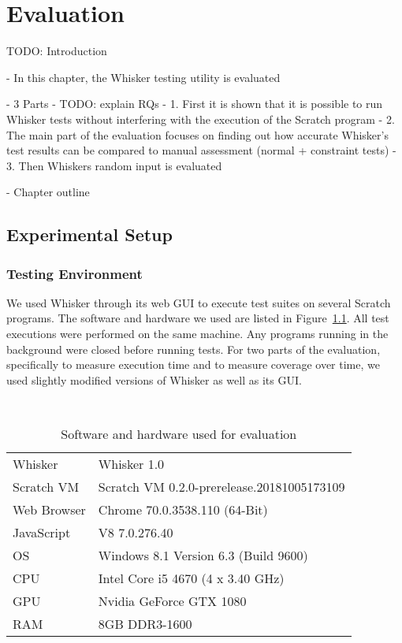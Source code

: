 

\chapter{Evaluation}%
\label{cha:evaluation}

TODO: Introduction

- In this chapter, the Whisker testing utility is evaluated

- 3 Parts
- TODO: explain RQs
    - 1. First it is shown that it is possible to run Whisker tests without interfering with the execution of the Scratch program
    - 2. The main part of the evaluation focuses on finding out how accurate Whisker's test results can be compared to manual assessment (normal + constraint tests)
    - 3. Then Whiskers random input is evaluated

- Chapter outline

\section{Experimental Setup}

\subsection{Testing Environment}

We used Whisker through its web GUI to execute test suites on several Scratch programs.
The software and hardware we used are listed in Figure~\ref{tab:evaluation_setup}.
All test executions were performed on the same machine.
Any programs running in the background were closed before running tests.
For two parts of the evaluation,
specifically to measure execution time and to measure coverage over time,
we used slightly modified versions of Whisker as well as its GUI.

\begin{table}[ht]
    \centering
    \scriptsize \tt
    \begin{tabular}{ll}
        \toprule
        Whisker     & Whisker 1.0 \\
        Scratch VM  & Scratch VM 0.2.0-prerelease.20181005173109 \\
        Web Browser & Chrome 70.0.3538.110 (64-Bit) \\
        JavaScript  & V8 7.0.276.40 \\
        OS          & Windows 8.1 Version 6.3 (Build 9600) \\
        CPU         & Intel Core i5 4670 (4 x  3.40 GHz) \\
        GPU         & Nvidia GeForce GTX 1080 \\
        RAM         & 8GB DDR3-1600 \\
        \bottomrule
    \end{tabular}
    \caption{Software and hardware used for evaluation}
    \label{tab:evaluation_setup}
\end{table}

